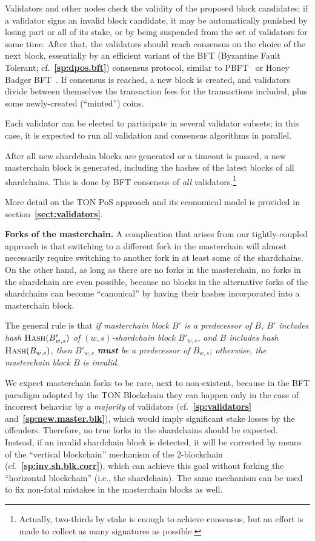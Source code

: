 \documentclass[12pt,oneside]{article}
\def\makepoint#1{\medbreak\noindent{\bf #1.\ }}
\def\nxsubpoint{\refstepcounter{subsubsection}%
  \smallbreak\makepoint{\thesubsubsection}}
\def\refpoint#1{{\rm\textbf{\ref{#1}}}}
\let\ptref=\refpoint
\def\embt(#1.){\textbf{#1.}}
\def\opsc#1{\operatorname{\textsc{#1}}}
\def\Hash{\opsc{Hash}}
\begin{document}
Validators and other nodes check the validity of the proposed block
candidates; if a validator signs an invalid block candidate, it may be
automatically punished by losing part or all of its stake, or by being
suspended from the set of validators for some time. After that, the
validators should reach consensus on the choice of the next block,
essentially by an efficient variant of the BFT (Byzantine Fault
Tolerant; cf.~\ptref{sp:dpos.bft}) consensus protocol, similar to
PBFT~\cite{PBFT} or Honey Badger BFT~\cite{HoneyBadger}. If consensus
is reached, a new block is created, and validators divide between
themselves the transaction fees for the transactions included, plus
some newly-created (``minted'') coins.

Each validator can be elected to participate in several validator
subsets; in this case, it is expected to run all validation and
consensus algorithms in parallel.

After all new shardchain blocks are generated or a timeout is passed,
a new masterchain block is generated, including the hashes of the
latest blocks of all shardchains. This is done by BFT consensus of
{\em all\/} validators.\footnote{Actually, two-thirds by stake is
  enough to achieve consensus, but an effort is made to collect as
  many signatures as possible.}

More detail on the TON PoS approach and its economical model is
provided in section~\ptref{sect:validators}.

\nxsubpoint \embt(Forks of the masterchain.)  A complication that
arises from our tightly-coupled approach is that switching to a
different fork in the masterchain will almost necessarily require
switching to another fork in at least some of the shardchains. On the
other hand, as long as there are no forks in the masterchain, no forks
in the shardchain are even possible, because no blocks in the
alternative forks of the shardchains can become ``canonical'' by
having their hashes incorporated into a masterchain block.

The general rule is that {\em if masterchain block $B'$ is a
  predecessor of $B$, $B'$ includes hash $\Hash(B'_{w,s})$ of
  $(w,s)$-shardchain block $B'_{w,s}$, and $B$ includes hash
  $\Hash(B_{w,s})$, then $B'_{w,s}$ {\bf must} be a predecessor of
  $B_{w,s}$; otherwise, the masterchain block $B$ is invalid.}

We expect masterchain forks to be rare, next to non-existent, because
in the BFT paradigm adopted by the TON Blockchain they can happen only
in the case of incorrect behavior by a {\em majority\/} of validators
(cf.~\ptref{sp:validators} and~\ptref{sp:new.master.blk}), which would
imply significant stake losses by the offenders. Therefore, no true
forks in the shardchains should be expected. Instead, if an invalid
shardchain block is detected, it will be corrected by means of the
``vertical blockchain'' mechanism of the 2-blockchain
(cf.~\ptref{sp:inv.sh.blk.corr}), which can achieve this goal without
forking the ``horizontal blockchain'' (i.e., the shardchain). The same
mechanism can be used to fix non-fatal mistakes in the masterchain
blocks as well.
\end{document}
